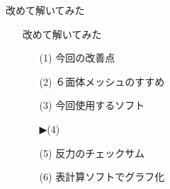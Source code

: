 \begin{frame}{改めて解いてみた}
  \begin{itemize}
      \item[] 改めて解いてみた
      \begin{itemize}[itemsep=1.3ex, leftmargin=1cm]
        \item[(1)]  {\color{cud_lightgray}今回の改善点}
	\item[(2)]  {\color{cud_lightgray}６面体メッシュのすすめ}
	\item[(3)]  {\color{cud_lightgray}今回使用するソフト}
	\item[▶(4)]   
	\item[(5)]  {\color{cud_lightgray}反力のチェックサム}
	\item[(6)]  {\color{cud_lightgray}表計算ソフトでグラフ化}
      \end{itemize}
  \end{itemize}
\end{frame}
